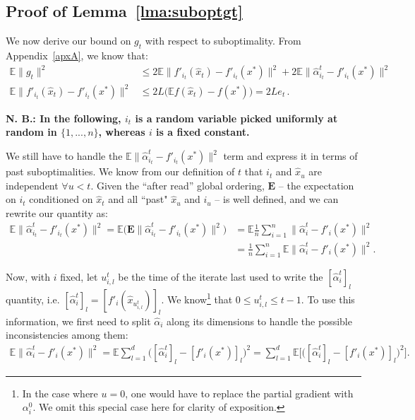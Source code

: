 \documentclass[twoside]{article}
\newcommand{\lipschitz}{L}
\newcommand{\E}{\mathbb{E}}
\newcommand{\Econd}{\mathbf{E}}
\begin{document}
\subsection{Proof of Lemma~\ref{lma:suboptgt}} \label{apxB:lma2}
We now derive our bound on $g_t$ with respect to suboptimality.
From Appendix~\ref{apxA}, we know that:
\begin{align}
\E\|g_t\|^2
&\leq 2 \E \|f'_{i_t}(\hat x_t)-f'_{i_t}(x^*)\|^2 
	+ 2 \E \|\hat \alpha_{i_t}^t - f'_{i_t}(x^*)\|^2 \label{eq:classicsaga}
\\
\E \|f'_{i_t}(\hat x_t)-f'_{i_t}(x^*)\|^2 
&\leq 2\lipschitz\big(\E f(\hat x_t) - f(x^*)\big)
= 2\lipschitz e_t  \, . \label{eq:classicsaga2}
\end{align}

\textbf{N. B.: In the following, $i_t$ is a random variable picked uniformly at random in $\{1,...,n\}$, whereas $i$ is a fixed constant.} 

We still have to handle the $\E \|\hat \alpha_{i_t}^t - f'_{i_t}(x^*)\|^2$ term and express it in terms of past suboptimalities. 
We know from our definition of $t$ that $i_t$ and $\hat x_u$ are independent $\forall u<t$.
Given the ``after read'' global ordering, $\Econd$ -- the expectation on $i_t$ conditioned on $\hat x_t$ and all ``past" $\hat x_u$ and $i_u$ -- is well defined, and we can rewrite our quantity as:
\begin{align*}
\E \|\hat \alpha_{i_t}^t - f'_{i_t}(x^*)\|^2 
= \E \big( \Econd \|\hat \alpha_{i_t}^t - f'_{i_t}(x^*)\|^2 \big)
&= \E \frac{1}{n} \sum_{i=1}^n  \|\hat \alpha_i^t - f'_i(x^*)\|^2
\\
&=  \frac{1}{n} \sum_{i=1}^n \E \|\hat \alpha_i^t - f'_i(x^*)\|^2 .
\end{align*}

Now, with $i$ fixed, let $u_{i,l}^t$ be the time of the iterate last used to write the $[\hat \alpha_{i}^t]_l$ quantity, i.e. $[\hat \alpha_{i}^t]_l = [f'_{i}(\hat x_{u_{i, l}^t})]_l$.
We know\footnote{In the case where $u=0$, one would have to replace the partial gradient with $\alpha_i^0$. We omit this special case here for clarity of exposition.} that $0 \leq u_{i,l}^t \leq t - 1$.
To use this information, we first need to split $\hat \alpha_i$ along its dimensions to handle the possible inconsistencies among them:
\begin{align*}
\E \|\hat \alpha_i^t - f'_i(x^*)\|^2
=
\E \sum_{l=1}^d \big([\hat \alpha_i^t]_l-[f'_i(x^*)]_l\big)^2
= 
\sum_{l=1}^d \E \Big[ \big([\hat \alpha_i^t]_l-[f'_i(x^*)]_l\big)^2 \Big] .
\end{align*}
\end{document}
